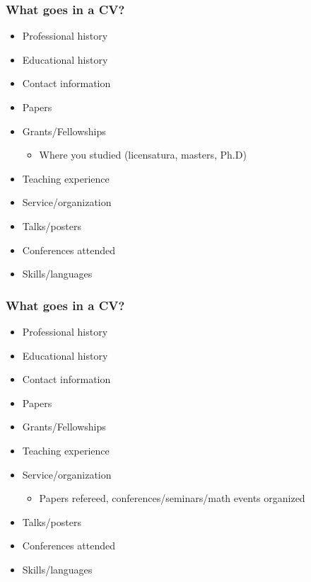 \documentclass{beamer}
\begin{document}
\begin{frame}\frametitle{What goes in a CV?}

\begin{itemize}
	\item Professional history
	\item Educational history
	\item Contact information
	\item Papers
	\item Grants/Fellowships
	\begin{itemize}
	\item Where you studied (licensatura, masters, Ph.D)
\end{itemize}
	\item Teaching experience
	\item Service/organization
	\item Talks/posters
	\item Conferences attended
	\item Skills/languages
\end{itemize}

\end{frame}

\begin{frame}\frametitle{What goes in a CV?}

\begin{itemize}
	\item Professional history
	\item Educational history
	\item Contact information
	\item Papers
	\item Grants/Fellowships
	\item Teaching experience
	\item Service/organization
	\begin{itemize}
		\item Papers refereed, conferences/seminars/math events organized
	\end{itemize}
	\item Talks/posters
	\item Conferences attended
	\item Skills/languages
\end{itemize}

\end{frame}
\end{document}
